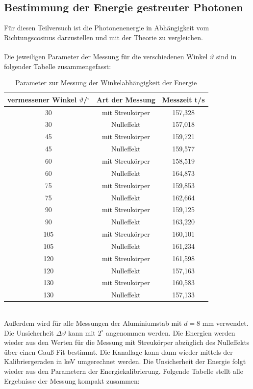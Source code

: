 \documentclass[german,  %
parskip=full,  %
]{scrartcl}
\begin{document}
\subsection{Bestimmung der Energie gestreuter Photonen}
Für diesen Teilversuch ist die Photonenenergie in Abhängigkeit vom Richtungscosinus darzustellen und mit der Theorie zu vergleichen.
\\\\
Die jeweiligen Parameter der Messung für die verschiedenen Winkel $\vartheta$ sind in folgender Tabelle zusammengefasst:
\\
\begin{table}[h!]\centering
\begin{tabular}{|c|c|c|}\hline
vermessener Winkel $\vartheta$/$^{\circ}$ & Art der Messung & Messzeit t/s \\\hline
30 & mit Streukörper & 157,328 			\\\hline
30 & Nulleffekt & 157,018 			\\\hline
45 & mit Streukörper & 159,721 			\\\hline
45 & Nulleffekt & 159,577			\\\hline
60 & mit Streukörper & 158,519			\\\hline
60 & Nulleffekt & 164,873		\\\hline
75 & mit Streukörper 	& 159,853		\\\hline
75 & Nulleffekt & 162,664			\\\hline
90 & mit Streukörper & 159,125 			\\\hline
90 & Nulleffekt & 163,220		\\\hline
105 & mit Streukörper	 & 160,101		\\\hline
105 & Nulleffekt 	& 161,234		\\\hline
120 & mit Streukörper	 & 161,598	\\\hline
120 & Nulleffekt & 157,163		\\\hline
130 & mit Streukörper & 160,583			\\\hline
130 & Nulleffekt 	& 157,133		\\\hline
\end{tabular}
\caption{Parameter zur Messung der Winkelabhängigkeit der Energie}
\end{table}
\\
Außerdem wird für alle Messungen der Aluminiumstab mit $d=8$ mm verwendet. Die Unsicherheit $\Delta \vartheta$ kann mit $2^{\circ}$ angenommen werden. Die Energien werden wieder aus den Werten für die Messung mit Streukörper abzüglich des Nulleffekts über einen Gauß-Fit bestimmt. Die Kanallage kann dann wieder mittels der Kalibriergeraden in keV umgerechnet werden. Die Unsicherheit der Energie folgt wieder aus den Parametern der Energiekalibrierung. Folgende Tabelle stellt alle Ergebnisse der Messung kompakt zusammen:
\end{document}
